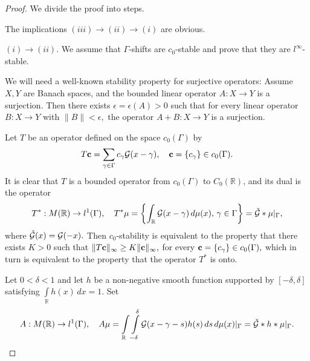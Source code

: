 \documentclass[12pt]{amsart}
\numberwithin{equation}{section}
\newcommand{\R}{{\mathbb R}} \newcommand{\Q}{{\mathbb Q}} \newcommand{\Z}{{\mathbb Z}} \newcommand{\N}{{\mathbb N}}
\begin{document}
\begin{proof} We divide the proof into steps.

 The implications  $(iii)\rightarrow (ii)\rightarrow (i)$ are obvious.

 $(i)\rightarrow (ii)$. We assume that $\Gamma$-shifts are $c_0$-stable and prove that they are $l^\infty$-stable.

We will need a well-known stability property for surjective operators: 
     Assume $X, Y$ are Banach spaces, and the bounded linear operator $A: X \to Y$ is a surjection. Then there exists $\epsilon=\epsilon(A) > 0$ such that for
every linear operator $B: X \to Y$ with $\|B\| < \epsilon,$  the operator $A + B: X \to Y$ is a surjection.


 Let $T$ be an operator defined on the space $c_0(\Gamma)$  by $$ T{\bf c}=\sum_{\gamma \in \Gamma}c_\gamma\mathcal{G}(x-\gamma),\quad {\bf c}=\{c_\gamma\}\in c_0(\Gamma).$$It is clear that $T$ is a bounded operator from $c_0(\Gamma)$ to  $C_0(\R)$,  and its dual is the operator$$T^\ast: M(\R)\to l^1(\Gamma),\quad T^{\ast} \mu=\left\{\int_\R \Ff(x-\gamma)\,d\mu(x),\,\gamma\in\Gamma\right\}=\check\Ff\ast\mu|_\Gamma,$$where $\check{\mathcal{G}}(x)=\mathcal{G}(-x).$
 Then $c_0$-stability is equivalent to the property that there exists $K>0$ such that  $\|T{\bf c}\|_\infty\geq K\|{\bf c}\|_\infty,$ for every ${\bf c}= \{c_{\gamma}\}\in c_0(\Gamma),$ which in turn is equivalent to the property 
     that the operator $T^\ast$ is onto. 

 Let $0<\delta<1$ and let  $h$ be a non-negative smooth function supported by $[-\delta,\delta]$  satisfying $\int\limits_{\R} h(x)\,dx=1$. Set
     $$A: M(\R)\to l^1(\Gamma),\quad A \mu=\int\limits_\R\int\limits_{-\delta}^\delta \Ff(x-\gamma-s)h(s)\,ds\,d\mu(x)|_{\Gamma}=\check\Ff\ast h\ast\mu|_\Gamma.$$
    

\end{proof}
\end{document}
